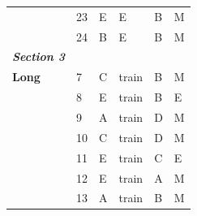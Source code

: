 \documentclass[pageno]{final_paper}
\newcommand{\textbi}[1]{\textbf{\textit{#1}}}
\begin{document}
\begin{table}[]
\begin{tabular}{llllll}
\textbf{}                & 23                                  & E                                          & E                                           & B                                           & M                                       \\
\textbf{}                & 24                                  & B                                          & E                                           & B                                           & M                                       \\ \midrule
\textbi{Section 3}       &                                     &                                            &                                             &                                             &                                         \\ \midrule
\textbf{Long}            & 7                                   & C                                          & train                                       & B                                           & M                                       \\
\textbf{}                & 8                                   & E                                          & train                                       & B                                           & E                                       \\
\textbf{}                & 9                                   & A                                          & train                                       & D                                           & M                                       \\
\textbf{}                & 10                                  & C                                          & train                                       & D                                           & M                                       \\
\textbf{}                & 11                                  & E                                          & train                                       & C                                           & E                                       \\
\textbf{}                & 12                                  & E                                          & train                                       & A                                           & M                                       \\
\textbf{}                & 13                                  & A                                          & train                                       & B                                           & M                                       \\

\end{tabular}
\end{table}
\end{document}
